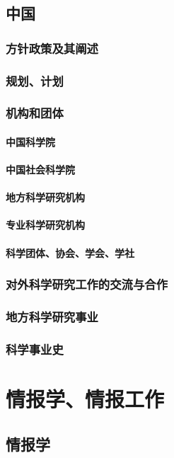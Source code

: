 \documentclass[UTF8]{../../ApplicationUniverse}
\begin{document}
\section{中国}
    \subsection{方针政策及其阐述}
    \subsection{规划、计划}
    \subsection{机构和团体}
        \subsubsection{中国科学院}
        \subsubsection{中国社会科学院}
        \subsubsection{地方科学研究机构}
        \subsubsection{专业科学研究机构}
        \subsubsection{科学团体、协会、学会、学社}
    \subsection{对外科学研究工作的交流与合作}
    \subsection{地方科学研究事业}
    \subsection{科学事业史}


\chapter{情报学、情报工作}
\section{情报学}
\end{document}
